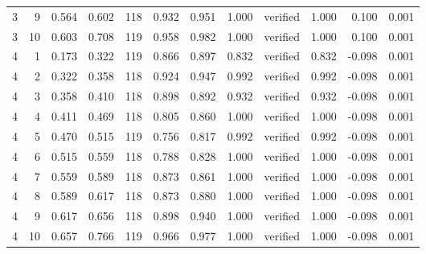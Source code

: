 \begin{tabular}{rrrrrrrrlrrr}
3 & 9 & 0.564 & 0.602 & 118 & 0.932 & 0.951 & 1.000 & verified & 1.000 & 0.100 & 0.001 \\
3 & 10 & 0.603 & 0.708 & 119 & 0.958 & 0.982 & 1.000 & verified & 1.000 & 0.100 & 0.001 \\
4 & 1 & 0.173 & 0.322 & 119 & 0.866 & 0.897 & 0.832 & verified & 0.832 & -0.098 & 0.001 \\
4 & 2 & 0.322 & 0.358 & 118 & 0.924 & 0.947 & 0.992 & verified & 0.992 & -0.098 & 0.001 \\
4 & 3 & 0.358 & 0.410 & 118 & 0.898 & 0.892 & 0.932 & verified & 0.932 & -0.098 & 0.001 \\
4 & 4 & 0.411 & 0.469 & 118 & 0.805 & 0.860 & 1.000 & verified & 1.000 & -0.098 & 0.001 \\
4 & 5 & 0.470 & 0.515 & 119 & 0.756 & 0.817 & 0.992 & verified & 0.992 & -0.098 & 0.001 \\
4 & 6 & 0.515 & 0.559 & 118 & 0.788 & 0.828 & 1.000 & verified & 1.000 & -0.098 & 0.001 \\
4 & 7 & 0.559 & 0.589 & 118 & 0.873 & 0.861 & 1.000 & verified & 1.000 & -0.098 & 0.001 \\
4 & 8 & 0.589 & 0.617 & 118 & 0.873 & 0.880 & 1.000 & verified & 1.000 & -0.098 & 0.001 \\
4 & 9 & 0.617 & 0.656 & 118 & 0.898 & 0.940 & 1.000 & verified & 1.000 & -0.098 & 0.001 \\
4 & 10 & 0.657 & 0.766 & 119 & 0.966 & 0.977 & 1.000 & verified & 1.000 & -0.098 & 0.001 \\
\bottomrule
\end{tabular}
